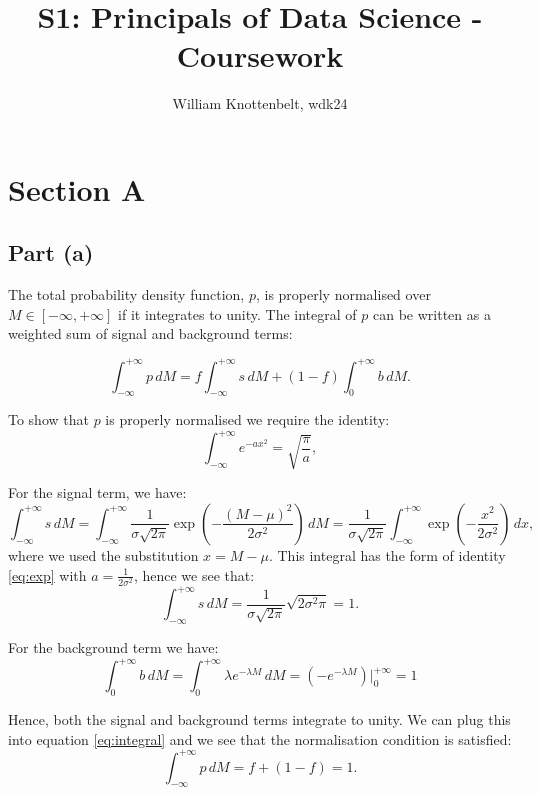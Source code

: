 \documentclass{article}
\title{S1: Principals of Data Science - Coursework}
\author{William Knottenbelt, wdk24}
\begin{document}
\maketitle


\section*{Section A}

\subsection*{Part (a)}

The total probability density function, $p$, is properly normalised over $M \in [-\infty, +\infty]$ if it integrates to unity. The integral of $p$ can be written as a weighted sum of signal and background terms:

\begin{equation}
\int_{-\infty}^{+\infty} p \, dM = 
f\int_{-\infty}^{+\infty} s \, dM + 
(1-f)\int_{0}^{+\infty} b \, dM.
\label{eq:integral}
\end{equation}

To show that $p$ is properly normalised we require the identity:
\begin{equation}
\int_{-\infty}^{+\infty} e^{-ax^2} = \sqrt{\frac{\pi}{a}},
\label{eq:exp}
\end{equation}

For the signal term, we have:
\[
\int_{-\infty}^{+\infty} s \, dM =
\int_{-\infty}^{+\infty} \frac{1}{\sigma\sqrt{2\pi}} \exp\left(-\frac{(M - \mu)^2}{2\sigma^2}\right) \, dM
= \frac{1}{\sigma\sqrt{2\pi}} \int_{-\infty}^{+\infty} \exp\left(-\frac{x^2}{2\sigma^2}\right) \, dx,
\]
where we used the substitution $x = M - \mu$. This integral has the form of identity \eqref{eq:exp} with $a = \frac{1}{2\sigma^2}$, hence we see that:
\[
\int_{-\infty}^{+\infty} s \, dM =
\frac{1}{\sigma\sqrt{2\pi}} \sqrt{2\sigma^2\pi} = 1.
\]

For the background term we have:
\[
\int_{0}^{+\infty} b \, dM =
\int_{0}^{+\infty} \lambda e^{-\lambda M} \, dM =
(-e^{-\lambda M}) |_0^{+\infty} = 1
\]

Hence, both the signal and background terms integrate to unity. We can plug this into equation \ref{eq:integral} and we see that the normalisation condition is satisfied:
\[ 
\int_{-\infty}^{+\infty} p \, dM = 
f + (1-f) = 1.
\]
\end{document}
